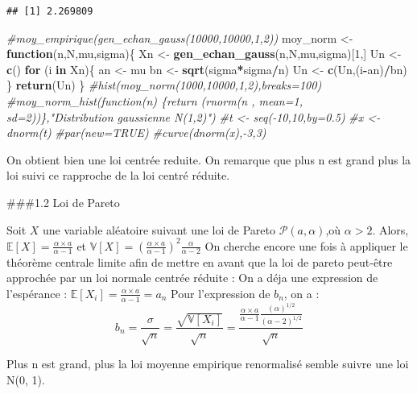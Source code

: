 \documentclass[]{article}
\newenvironment{Shaded}{\begin{snugshade}}{\end{snugshade}}
\newcommand{\CommentTok}[1]{\textcolor[rgb]{0.56,0.35,0.01}{\textit{#1}}}
\newcommand{\ControlFlowTok}[1]{\textcolor[rgb]{0.13,0.29,0.53}{\textbf{#1}}}
\newcommand{\DecValTok}[1]{\textcolor[rgb]{0.00,0.00,0.81}{#1}}
\newcommand{\KeywordTok}[1]{\textcolor[rgb]{0.13,0.29,0.53}{\textbf{#1}}}
\newcommand{\NormalTok}[1]{#1}
\newcommand{\OperatorTok}[1]{\textcolor[rgb]{0.81,0.36,0.00}{\textbf{#1}}}
\newcommand{\StringTok}[1]{\textcolor[rgb]{0.31,0.60,0.02}{#1}}
\begin{document}
\begin{verbatim}
## [1] 2.269809
\end{verbatim}

\begin{Shaded}
\begin{Highlighting}[]
\CommentTok{#moy_empirique(gen_echan_gauss(10000,10000,1,2))}
\NormalTok{moy_norm <-}\StringTok{ }\ControlFlowTok{function}\NormalTok{(n,N,mu,sigma)\{}
\NormalTok{  Xn <-}\StringTok{ }\KeywordTok{gen_echan_gauss}\NormalTok{(n,N,mu,sigma)[}\DecValTok{1}\NormalTok{,]}
\NormalTok{  Un <-}\StringTok{ }\KeywordTok{c}\NormalTok{()}
  \ControlFlowTok{for}\NormalTok{ (i }\ControlFlowTok{in}\NormalTok{ Xn)\{}
\NormalTok{    an <-}\StringTok{ }\NormalTok{mu}
\NormalTok{    bn <-}\StringTok{ }\KeywordTok{sqrt}\NormalTok{(sigma}\OperatorTok{*}\NormalTok{sigma}\OperatorTok{/}\NormalTok{n)}
\NormalTok{    Un <-}\StringTok{ }\KeywordTok{c}\NormalTok{(Un,(i}\OperatorTok{-}\NormalTok{an)}\OperatorTok{/}\NormalTok{bn)}
\NormalTok{  \}}
  \KeywordTok{return}\NormalTok{(Un)}
\NormalTok{\}}
\CommentTok{#hist(moy_norm(1000,10000,1,2),breaks=100)}
\CommentTok{#moy_norm_hist(function(n) \{return (rnorm(n , mean=1, sd=2))\},"Distribution gaussienne N(1,2)")}
\CommentTok{#t <- seq(-10,10,by=0.5)}
\CommentTok{#x <- dnorm(t)}
\CommentTok{#par(new=TRUE)}
\CommentTok{#curve(dnorm(x),-3,3)}
\end{Highlighting}
\end{Shaded}

On obtient bien une loi centrée reduite. On remarque que plus n est
grand plus la loi suivi ce rapproche de la loi centré réduite.

\#\#\#1.2 Loi de Pareto

Soit \(X\) une variable aléatoire suivant une loi de Pareto
\(\mathcal{P}(a, \alpha)\),où \(\alpha > 2\). Alors,
\(\mathbb{E}[X]=\frac{\alpha \times a}{\alpha - 1}\) et
\(\mathbb{V}[X]=(\frac{\alpha \times a}{\alpha - 1})^2\frac{\alpha}{\alpha - 2}\)
On cherche encore une fois à appliquer le théorème centrale limite afin
de mettre en avant que la loi de pareto peut-être approchée par un loi
normale centrée réduite : On a déja une expression de l'espérance :
\(\mathbb{E}[X_{i}]=\frac{\alpha\times a}{\alpha - 1}=a_{n}\) Pour
l'expression de \(b_n\), on a :
\[b_{n}=\frac{\sigma}{\sqrt{n}}=\frac{\sqrt{\mathbb{V}[X_{i}]}}{\sqrt{n}}=\frac{\frac{\alpha\times a}{\alpha - 1}\frac{(\alpha)^{1/2}}{(\alpha - 2)^{1/2}}}{\sqrt{n}} \]

Plus n est grand, plus la loi moyenne empirique renormalisé semble
suivre une loi N(0, 1).
\end{document}
